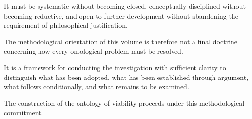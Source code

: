 It must be systematic
without becoming closed,
conceptually disciplined
without becoming reductive,
and open to further development
without abandoning the
requirement of philosophical
justification.

The methodological orientation
of this volume is therefore
not a final doctrine concerning
how every ontological problem
must be resolved.

It is a framework for conducting
the investigation with sufficient
clarity to distinguish what
has been adopted, what has
been established through
argument, what follows
conditionally, and what
remains to be examined.

The construction of the
ontology of viability proceeds
under this methodological
commitment.

\cleardoublepage

